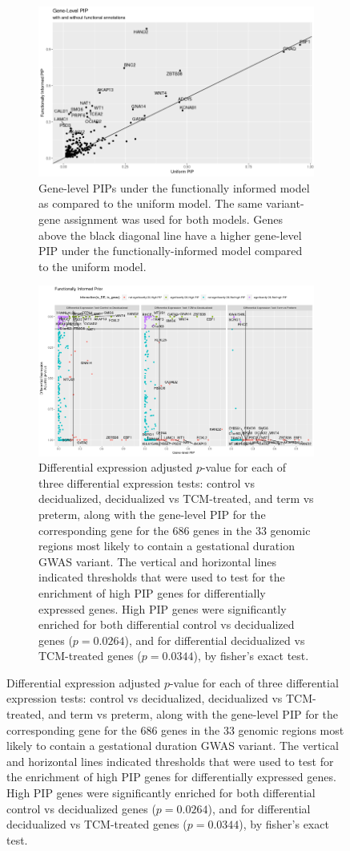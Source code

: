 \begin{figure}
  \centering
  \begin{subfigure}[t]{\textwidth}
    \centering
    \includegraphics[width=\linewidth]{img/null-gene-gene-comp.png}
    \caption{Gene-level PIPs under the functionally informed model as compared to the uniform model.  The same variant-gene assignment was used for both models.  Genes above the black diagonal line have a higher gene-level PIP under the functionally-informed model compared to the uniform model.  }\label{fig:univ_assoc}
  \end{subfigure}
    \begin{subfigure}[t]{\textwidth}
    \centering
    \includegraphics[width=\linewidth]{img/de-gwas-comp.png}
    \caption{Differential expression adjusted $p$-value for each of three differential expression tests: control vs decidualized, decidualized vs TCM-treated, and term vs preterm, along with the gene-level PIP for the corresponding gene for the 686 genes in the 33 genomic regions most likely to contain a gestational duration GWAS variant.  The vertical and horizontal lines indicated thresholds that were used to test for the enrichment of high PIP genes for differentially expressed genes. High PIP genes were significantly enriched for both differential control vs decidualized genes ($p=0.0264$), and for differential decidualized vs TCM-treated genes ($p=0.0344$), by fisher's exact test.}\label{fig:multiv_assoc}
    \end{subfigure}
\end{figure}





